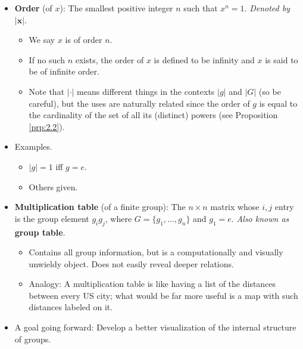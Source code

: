 \documentclass[../notes.tex]{subfiles}
\begin{document}
\begin{itemize}
\begin{itemize}
    \end{itemize}
    \item \textbf{Order} (of $x$): The smallest positive integer $n$ such that $x^n=1$. \emph{Denoted by} $\bm{|x|}$.
    \begin{itemize}
        \item We say $x$ is of order $n$.
        \item If no such $n$ exists, the order of $x$ is defined to be infinity and $x$ is said to be of infinite order.
        \item Note that $|\cdot|$ means different things in the contexts $|g|$ and $|G|$ (so be careful), but the uses are naturally related since the order of $g$ is equal to the cardinality of the set of all its (distinct) powers (see Proposition \ref{prp:2.2}).
    \end{itemize}
    \item Examples.
    \begin{itemize}
        \item $|g|=1$ iff $g=e$.
        \item Others given.
    \end{itemize}
    \item \textbf{Multiplication table} (of a finite group): The $n\times n$ matrix whose $i,j$ entry is the group element $g_ig_j$, where $G=\{g_1,\dots,g_n\}$ and $g_1=e$. \emph{Also known as} \textbf{group table}.
    \begin{itemize}
        \item Contains all group information, but is a computationally and visually unwieldy object. Does not easily reveal deeper relations.
        \item Analogy: A multiplication table is like having a list of the distances between every US city; what would be far more useful is a map with such distances labeled on it.
    \end{itemize}
    \item A goal going forward: Develop a better visualization of the internal structure of groups.
\end{itemize}
\end{document}
